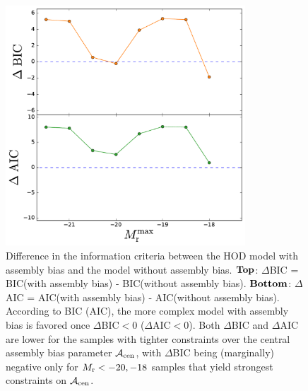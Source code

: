 \begin{figure}[p]~\\
\begin{center}
\includegraphics[width=0.8\textwidth]{IC.pdf}
\caption{Difference in the information criteria between the HOD model with assembly bias and the model without assembly bias. $\bf{Top}$: $\Delta$BIC = BIC(with assembly bias) - BIC(without assembly bias). $\bf{Bottom}$: $\Delta$AIC = AIC(with assembly bias) - AIC(without assembly bias). According to BIC (AIC), the more complex model with assembly bias is favored once $\Delta$BIC$<0$ ($\Delta$AIC$<0$). Both $\Delta$BIC and $\Delta$AIC are lower for the samples with tighter constraints over the central assembly bias parameter $\mathcal{A}_{\rm cen}$, with $\Delta$BIC being (marginally) negative only for $M_{\rm r}<-20,-18$ samples that yield strongest constraints on $\mathcal{A}_{\rm cen}$.} 
\label{fig:ic}
\end{center}
\end{figure}

\clearpage

